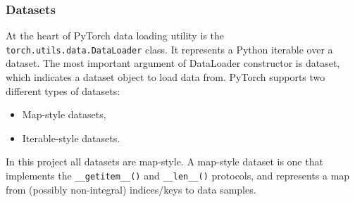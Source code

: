 \documentclass[../main.tex]{subfiles}
\begin{document}
\subsubsection{Datasets}\label{appendix:datasets}
At the heart of PyTorch data loading utility is the
\verb|torch.utils.data.DataLoader| class.
It represents a Python iterable over a dataset.
The most important argument of DataLoader constructor is dataset, which
indicates a dataset object to load data from.
PyTorch supports two different types of datasets:
\begin{itemize}
\item Map-style datasets,
\item Iterable-style datasets.
\end{itemize}
In this project all datasets are map-style.
A map-style dataset is one that implements the
\verb|__getitem__()| and \verb|__len__()| protocols,
and represents a map from (possibly non-integral) indices/keys to data samples.
\end{document}
